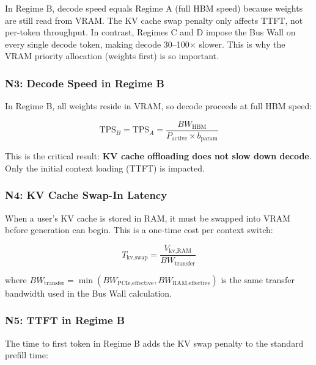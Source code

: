\documentclass[11pt,a4paper]{article}
\theoremstyle{definition}
\begin{document}
\begin{defbox}
In Regime B, decode speed equals Regime A (full HBM speed) because weights are still read from VRAM. The KV cache swap penalty only affects TTFT, not per-token throughput. In contrast, Regimes C and D impose the Bus Wall on every single decode token, making decode 30--100$\times$ slower. This is why the VRAM priority allocation (weights first) is so important.
\end{defbox}

\subsubsection{N3: Decode Speed in Regime B}

In Regime B, all weights reside in VRAM, so decode proceeds at full HBM speed:

\begin{equation}\label{eq:regime_b_tps}
\text{TPS}_B = \text{TPS}_A = \frac{BW_{\text{HBM}}}{P_{\text{active}} \times b_{\text{param}}}
\end{equation}

This is the critical result: \textbf{KV cache offloading does not slow down decode}. Only the initial context loading (TTFT) is impacted.

\subsubsection{N4: KV Cache Swap-In Latency}

When a user's KV cache is stored in RAM, it must be swapped into VRAM before generation can begin. This is a one-time cost per context switch:

\begin{equation}\label{eq:kv_swap}
T_{\text{kv,swap}} = \frac{V_{\text{kv,RAM}}}{BW_{\text{transfer}}}
\end{equation}

where $BW_{\text{transfer}} = \min(BW_{\text{PCIe,effective}}, BW_{\text{RAM,effective}})$ is the same transfer bandwidth used in the Bus Wall calculation.

\subsubsection{N5: TTFT in Regime B}

The time to first token in Regime B adds the KV swap penalty to the standard prefill time:
\end{document}
